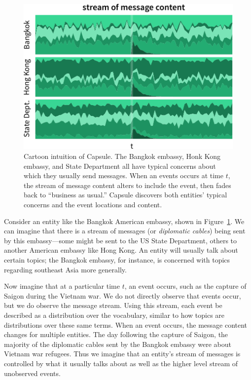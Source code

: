 \begin{figure}
\centering
\includegraphics[width=\linewidth]{fig/cartoon.pdf}
\caption{Cartoon intuition of Capsule.  The Bangkok embassy, Honk Kong embassy, and State Department all have typical concerns about which they usually send messages.  When an events occurs at time $t$, the stream of message content alters to include the event, then fades back to ``business as usual.''  Capsule discovers both entities' typical concerns and the event locations and content.}
\label{fig:cartoon}
\end{figure}

Consider an entity like the Bangkok American embassy, shown in Figure~\ref{fig:cartoon}.  We can imagine that there is a stream of messages (or \emph{diplomatic cables}) being sent by this embassy---some might be sent to the US State Department, others to another American embassy like Hong Kong.  An entity will usually talk about certain topics; the Bangkok embassy, for instance, is concerned with topics regarding southeast Asia more generally.

Now imagine that at a particular time $t$, an event occurs, such as the capture of Saigon during the Vietnam war.  We do not directly observe that events occur, but we do observe the message stream.  Using this stream, each event be described as a distribution over the vocabulary, similar to how topics are distributions over these same terms.  When an event occurs, the message content changes for multiple entities. The day following the capture of Saigon, the majority of the diplomatic cables sent by the Bangkok embassy were about Vietnam war refugees.
Thus we imagine that an entity's stream of messages is controlled by what it usually talks about as well as the higher level stream of unobserved events.

